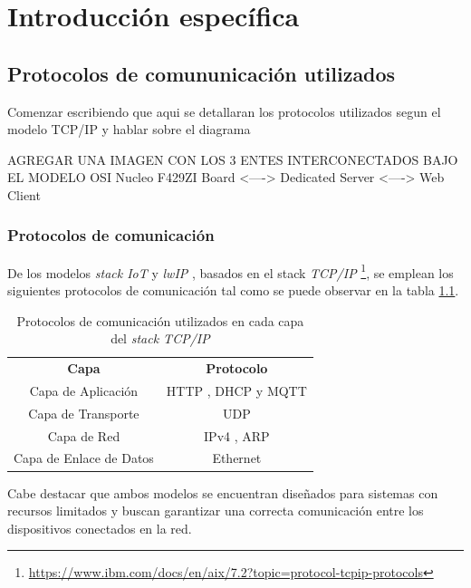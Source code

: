 \chapter{Introducción específica} %

\label{Chapter2}


\section{Protocolos de comununicación utilizados}

  Comenzar escribiendo que aqui se detallaran los protocolos utilizados segun el modelo TCP/IP y hablar sobre el diagrama    

  AGREGAR UNA IMAGEN CON LOS 3 ENTES INTERCONECTADOS BAJO EL MODELO OSI 
        Nucleo F429ZI Board <----> Dedicated Server <----> Web Client


\subsection{Protocolos de comunicación}

De los modelos \textit{stack IoT} y \textit{lwIP} \citep{lwip}, basados en el stack \textit{TCP/IP} \footnote{\url{https://www.ibm.com/docs/en/aix/7.2?topic=protocol-tcpip-protocols}}, se emplean los siguientes protocolos de comunicación tal como se puede observar en la tabla \ref{tab:capa_protocolo}. 


\begin{table}[h]
\centering
\caption{Protocolos de comunicación utilizados en cada capa del \textit{stack TCP/IP}}
\label{tab:capa_protocolo}
\begin{tabular}{|c|c|}
\hline
\textbf{Capa} & \textbf{Protocolo} \\ \cline{1-2}
Capa de Aplicación & HTTP \citep{http}, DHCP \citep{dhcp} y MQTT \citep{mqtt} \\ \cline{1-2}
Capa de Transporte & UDP \citep{udp} \\ \cline{1-2}
Capa de Red & IPv4 \citep{ipv4}, ARP \citep{arp} \\ \cline{1-2}
Capa de Enlace de Datos & Ethernet \citep{ethernet} \\ \cline{1-2}
\end{tabular}
\end{table}

Cabe destacar que ambos modelos se encuentran diseñados para sistemas con recursos limitados y buscan garantizar una correcta comunicación entre los dispositivos conectados en la red.


